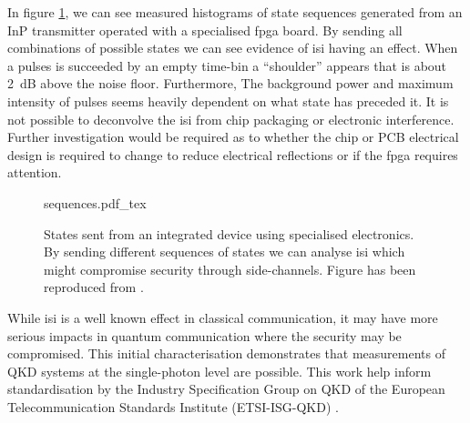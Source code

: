 

In figure \ref{fig:npl_states}, we can see measured histograms of state sequences generated from an \ac{InP} transmitter operated with a specialised \ac{fpga} board. By sending all combinations of possible states we can see evidence of \ac{isi} having an effect. When a pulses is succeeded by an empty time-bin a ``shoulder'' appears that is about \SI{2}{dB} above the noise floor. Furthermore, The background power and maximum intensity of pulses seems heavily dependent on what state has preceded it. It is not possible to deconvolve the \ac{isi} from chip packaging or electronic interference. Further investigation would be required as to whether the chip or PCB electrical design is required to change to reduce electrical reflections or if the \ac{fpga} requires attention.


\begin{figure}[t]
	\centering
	\tiny
	\def\svgwidth{\textwidth} 
	{sequences.pdf_tex}
	\caption[Security analysis of transmitters driven by specialised electronics]{States sent from an integrated device using specialised electronics. By sending different sequences of states we can analyse \ac{isi} which might compromise security through side-channels. Figure has been reproduced from \cite{vaquero2018}.}
	\label{fig:npl_states}
\end{figure}

While \ac{isi} is a well known effect in classical communication, it may have more serious impacts in quantum communication where the security may be compromised. This initial characterisation demonstrates that measurements of \ac{QKD} systems at the single-photon level are possible. This work help inform standardisation by the Industry Specification Group on QKD of the European Telecommunication Standards Institute (ETSI-ISG-QKD) \cite{ETSI}.

